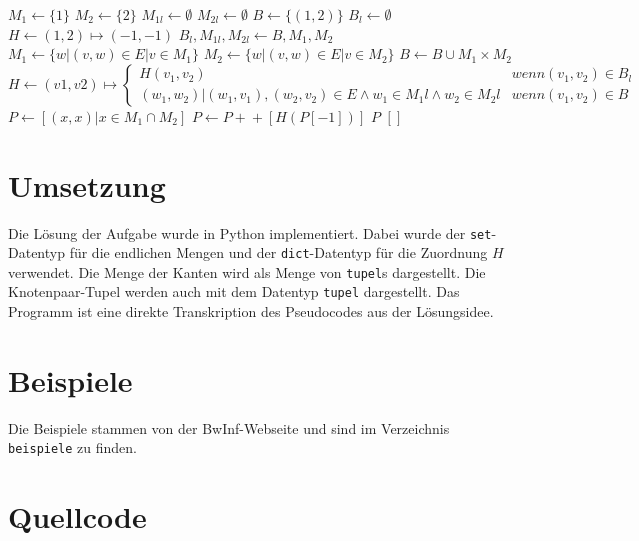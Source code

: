 \documentclass[a4paper,10pt,ngerman]{scrartcl}
\begin{document}
\begin{algorithmic}
  \State$M_1 \gets \{1\}$
  \State$M_2 \gets \{2\}$
  \State$M_{1l} \gets \emptyset$
  \State$M_{2l} \gets \emptyset$
  \State$B \gets \{(1, 2)\}$
  \State$B_l \gets \emptyset$
  \State$H \gets (1, 2) \mapsto (-1, -1)$
  \State$B_l, M_{1l}, M_{2l} \gets B, M_1, M_2$
  \State$M_1 \gets \{w | (v, w) \in E | v \in M_1\} $
  \State$M_2 \gets \{w | (v, w) \in E | v \in M_2\} $
  \State$B \gets B \cup M_1 \times M_2$
  \State$H \gets (v1, v2) \mapsto \begin{cases}
      H(v_1, v_2)                                                                 & wenn (v_1,v_2) \in B_l \\
      (w_1, w_2)|(w_1,v_1), (w_2,v_2) \in E \land w_1 \in M_1l \land w_2 \in M_2l & wenn (v_1,v_2) \in B
    \end{cases}$
  \EndWhile
  \State$P \gets [(x,x) | x \in M_1 \cap M_2]$
  \State$P \gets P +\!\!\!+ [H(P[-1])]$
  \EndWhile
  \State \Return $P$
  \Else
  \State \Return $[]$
  \EndIf
\end{algorithmic}
\section{Umsetzung}
Die Lösung der Aufgabe wurde in Python implementiert. Dabei wurde der
\lstinline|set|-Datentyp für die endlichen Mengen und der
\lstinline|dict|-Datentyp für die Zuordnung $H$ verwendet. Die Menge der Kanten wird
als Menge von \lstinline|tupel|s dargestellt. Die Knotenpaar-Tupel werden auch mit dem Datentyp
\lstinline|tupel| dargestellt. Das Programm ist eine direkte Transkription des Pseudocodes aus der Lösungsidee.\\

\section{Beispiele}
Die Beispiele stammen von der BwInf-Webseite und sind im Verzeichnis \lstinline|beispiele| zu finden.\\
\section{Quellcode}

\end{document}
